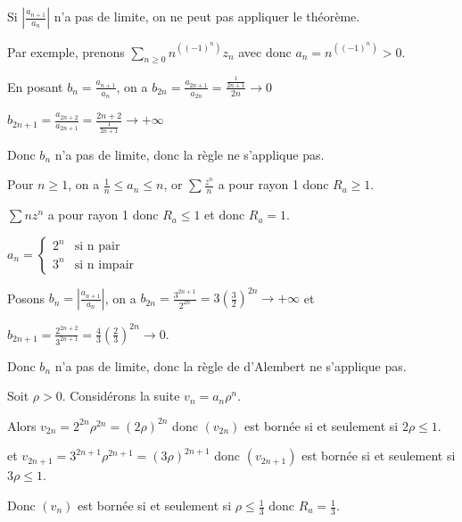 \begin{remarque}
    Si $\left| \frac{a_{n + 1 }}{a_n } \right|$ n'a pas de limite, on ne peut pas appliquer le théorème.

    Par exemple, prenons $\sum_{n \geqslant 0 } n^{((-1)^n)}z_n$ avec donc $a_n = n^{((-1)^n)} > 0$.

    En posant $b_n =\frac{a_{n + 1 }}{a_n }$, on a $b_{2n} = \frac {a_{2n + 1}} {a_{2n}} = \frac{\frac{1 }{2n + 1}}{2n} \to 0$

    $b_{2n + 1} = \frac{a_{2n + 2}}{a_{2n + 1}} = \frac{2n + 2}{\frac 1 {2n + 1}} \to +\infty$

    Donc $b_n$ n'a pas de limite, donc la règle ne s'applique pas.

    Pour $n \geqslant 1$, on a $\frac 1 n \leqslant a_n \leqslant n$, or 
    $\sum \frac{z^n }{n }$ a pour rayon 1 donc $R_a \geqslant 1$. 

    $\sum n z^n$ a pour rayon 1 donc $R_a \leqslant 1$ et donc $R_a = 1$.
\end{remarque}

\begin{exemple}
    $a_n = \left\{ \begin{matrix} 2^n & \text{si n pair} \\ 3^n & \text{si n impair} \end{matrix}\right.$

    Posons $b_n = \left| \frac{a_{n + 1}}{a_n} \right|$, on a $b_{2n} = \frac{3^{2n + 1}}{2^{2n}} = 3 \left( \frac 3 2  \right)^{2n} \to + \infty$ et

    $b_{2n + 1} = \frac{2^{2n + 2}}{3^{2n + 1}} = \frac 4 3 \left( \frac 2 3 \right)^{2n} \to 0$.

    Donc $b_n$ n'a pas de limite, donc la règle de d'Alembert ne s'applique pas.

    Soit $\rho >0$. Considérons la suite $v_n = a_n \rho^n$.

    Alors $v_{2n} = 2^{2n} \rho^{2n} = (2 \rho)^{2n}$ donc $(v_{2n})$ est bornée si et seulement si $2 \rho \leqslant 1$.
    
    et $v_{2n + 1} = 3^{2n + 1} \rho^{2n + 1} = (3 \rho)^{2n + 1}$ donc $(v_{2n + 1})$ est bornée si et seulement si $3 \rho \leqslant 1$.

    Donc $(v_n)$ est bornée si et seulement si $\rho \leqslant \frac 1 3$ donc $R_a = \frac 1 3$.

\end{exemple}

